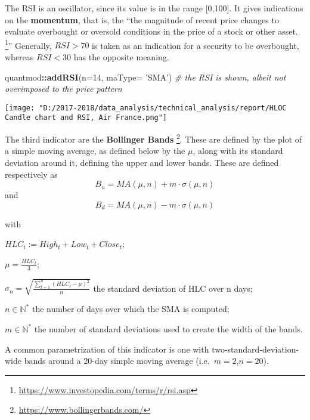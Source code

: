 \documentclass[
  11pt,
]{article}
\newenvironment{Shaded}{\begin{snugshade}}{\end{snugshade}}
\newcommand{\CommentTok}[1]{\textcolor[rgb]{0.56,0.35,0.01}{\textit{#1}}}
\newcommand{\DataTypeTok}[1]{\textcolor[rgb]{0.13,0.29,0.53}{#1}}
\newcommand{\DecValTok}[1]{\textcolor[rgb]{0.00,0.00,0.81}{#1}}
\newcommand{\KeywordTok}[1]{\textcolor[rgb]{0.13,0.29,0.53}{\textbf{#1}}}
\newcommand{\NormalTok}[1]{#1}
\newcommand{\OperatorTok}[1]{\textcolor[rgb]{0.81,0.36,0.00}{\textbf{#1}}}
\newcommand{\StringTok}[1]{\textcolor[rgb]{0.31,0.60,0.02}{#1}}
\let\origfigure\figure
\let\endorigfigure\endfigure
\renewenvironment{figure}[1][2] {
    \expandafter\origfigure\expandafter[H]
} {
    \endorigfigure
}
\begin{document}
The RSI is an oscillator, since its value is in the range {[}0,100{]}.
It gives indications on the \textbf{momentum}, that is, the ``the
magnitude of recent price changes to evaluate overbought or oversold
conditions in the price of a stock or other asset. \footnote{\url{https://www.investopedia.com/terms/r/rsi.asp}}''
Generally, \(RSI>70\) is taken as an indication for a security to be
overbought, whereas \(RSI < 30\) has the opposite meaning.

\begin{Shaded}
\begin{Highlighting}[]
\NormalTok{quantmod}\OperatorTok{::}\KeywordTok{addRSI}\NormalTok{(}\DataTypeTok{n=}\DecValTok{14}\NormalTok{, }\DataTypeTok{maType=} \StringTok{'SMA'}\NormalTok{) }
\CommentTok{# the RSI is shown, albeit not overimposed to the price pattern}
\end{Highlighting}
\end{Shaded}

\begin{figure}
\centering
\texttt{[image: "D:/2017-2018/data\_analysis/technical\_analysis/report/HLOC Candle chart and RSI, Air France.png"]}
\caption{Daily HLOC Chart price with RSI(14)}
\end{figure}

The third indicator are the \textbf{Bollinger Bands} \footnote{\url{https://www.bollingerbands.com/}}.
These are defined by the plot of a simple moving average, as defined
below by the \(\mu\), along with its standard deviation around it,
defining the upper and lower bands. These are defined respectively as
\begin{equation}
B_u = MA(\mu, n) + m \cdot \sigma(\mu,n)
\end{equation} and \begin{equation}
B_d = MA(\mu, n) - m \cdot \sigma(\mu,n)
\end{equation}

with

\(HLC_t:=High_t +Low_t + Close_t\);

\(\mu= \frac{HLC_t}{3}\);

\(\sigma_n= \sqrt{\displaystyle \frac{\sum_{t=1}^{n} {(HLC_t-\mu)^2}}{n}}\)
the standard deviation of HLC over n days;

\(n \in \mathbb{N^*}\) the number of days over which the SMA is
computed;

\(m \in \mathbb{N^*}\) the number of standard deviations used to create
the width of the bands.

A common parametrization of this indicator is one with
two-standard-deviation-wide bands around a 20-day simple moving average
(i.e.~\(m=2\),\(n=20\)).
\end{document}
